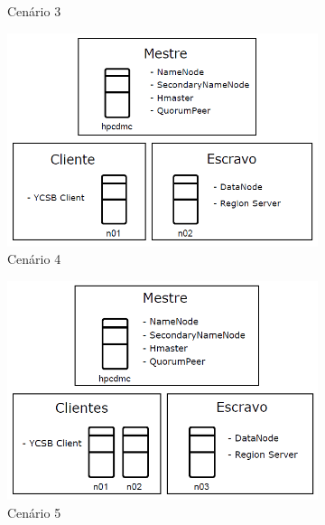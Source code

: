 \documentclass[12pt]{article}
\begin{document}
\begin{figure}
\begin{subfigure}{0.3\textwidth}
        \caption{Cenário 3}
        \label{figura2c}
    \end{subfigure}
    \medskip
    \begin{subfigure}{0.3\textwidth}   
    	\centering
        \includegraphics[width=1.0\textwidth]{images/cenario-4.png}
        \caption{Cenário 4}%
        \label{figura2d}
    \end{subfigure}
    \begin{subfigure}{0.3\textwidth}
    	\centering
        \includegraphics[width=1.0\textwidth]{images/cenario-5.png}
        \caption{Cenário 5}
        \label{figura2e}
    \end{subfigure}
    \begin{subfigure}{0.35\textwidth}   
    	\centering

\end{subfigure}
\end{figure}
\end{document}
